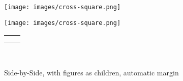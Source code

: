 \documentclass[10pt,]{article}
\theoremstyle{plain}
\theoremstyle{definition}
\theoremstyle{definition}
\theoremstyle{definition}
\theoremstyle{definition}
\theoremstyle{definition}
\theoremstyle{definition}
\numberwithin{equation}{section}
\newlength{\panelmax}
\begin{document}
\begin{figure}
\centering
{%
\setlength{\panelmax}{0pt}
\ifdefined\panelboxAimage\else\newsavebox{\panelboxAimage}\fi%
\begin{lrbox}{\panelboxAimage}
\texttt{[image: images/cross-square.png]}
\end{lrbox}
\ifdefined\phAimage\else\newlength{\phAimage}\fi%
\setlength{\phAimage}{\ht\panelboxAimage+\dp\panelboxAimage}
\settototalheight{\phAimage}{\usebox{\panelboxAimage}}
\setlength{\panelmax}{\maxof{\panelmax}{\phAimage}}
\ifdefined\panelboxBimage\else\newsavebox{\panelboxBimage}\fi%
\begin{lrbox}{\panelboxBimage}
\texttt{[image: images/cross-square.png]}
\end{lrbox}
\ifdefined\phBimage\else\newlength{\phBimage}\fi%
\setlength{\phBimage}{\ht\panelboxBimage+\dp\panelboxBimage}
\settototalheight{\phBimage}{\usebox{\panelboxBimage}}
\setlength{\panelmax}{\maxof{\panelmax}{\phBimage}}
\leavevmode%
\setlength{\tabcolsep}{0.123325\linewidth}
\par\medskip\noindent
\hspace*{0.123325\linewidth}%
\begin{tabular}{@{}*{2}{c}@{}}
\begin{minipage}[c][\panelmax][t]{0.2567\linewidth}\usebox{\panelboxAimage}\end{minipage}&
\begin{minipage}[c][\panelmax][t]{0.25\linewidth}\usebox{\panelboxBimage}\end{minipage}\tabularnewline
\parbox[t]{0.2567\linewidth}{\subcaption{\label{fig-sidebyside-subfigure}}
}&
\parbox[t]{0.25\linewidth}{\subcaption{\label{figure-50}}
}\end{tabular}\\
}%
\caption{Side-by-Side, with figures as children, automatic margin\label{fig-sidebyside-global}}
\end{figure}
\end{document}

